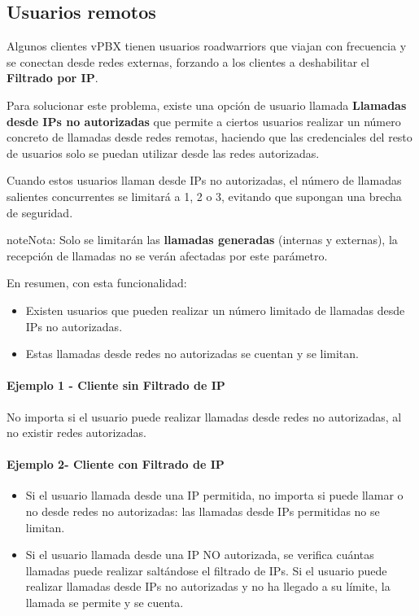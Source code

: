 \documentclass[letterpaper,10pt,spanish]{sphinxmanual}
\begin{document}
\subsection{Usuarios remotos}
\label{security_and_maintenance/security/authorized_ip_ranges:roadwarrior-users}\label{security_and_maintenance/security/authorized_ip_ranges:id1}
Algunos clientes vPBX tienen usuarios roadwarriors que viajan con frecuencia y se conectan desde redes externas, forzando a los clientes a deshabilitar el \textbf{Filtrado por IP}.

Para solucionar este problema, existe una opción de usuario llamada \textbf{Llamadas desde IPs no autorizadas} que permite a ciertos usuarios realizar un número concreto de llamadas desde redes remotas, haciendo que las credenciales del resto de usuarios solo se puedan utilizar desde las redes autorizadas.

Cuando estos usuarios llaman desde IPs no autorizadas, el número de llamadas salientes concurrentes se limitará a 1, 2 o 3, evitando que supongan una brecha de seguridad.

\begin{notice}{note}{Nota:}
Solo se limitarán las \textbf{llamadas generadas} (internas y externas), la recepción de llamadas no se verán afectadas por este parámetro.
\end{notice}

En resumen, con esta funcionalidad:
\begin{itemize}
\item {} 
Existen usuarios que pueden realizar un número limitado de llamadas desde IPs no autorizadas.

\item {} 
Estas llamadas desde redes no autorizadas se cuentan y se limitan.

\end{itemize}
\paragraph{Ejemplo 1 - Cliente sin Filtrado de IP}

No importa si el usuario puede realizar llamadas desde redes no autorizadas, al no existir redes autorizadas.
\paragraph{Ejemplo 2- Cliente con Filtrado de IP}
\begin{itemize}
\item {} 
Si el usuario llamada desde una IP permitida, no importa si puede llamar o no desde redes no autorizadas: las llamadas desde IPs permitidas no se limitan.

\item {} 
Si el usuario llamada desde una IP NO autorizada, se verifica cuántas llamadas puede realizar saltándose el filtrado de IPs. Si el usuario puede realizar llamadas desde IPs no autorizadas y no ha llegado a su límite, la llamada se permite y se cuenta.

\end{itemize}
\end{document}

